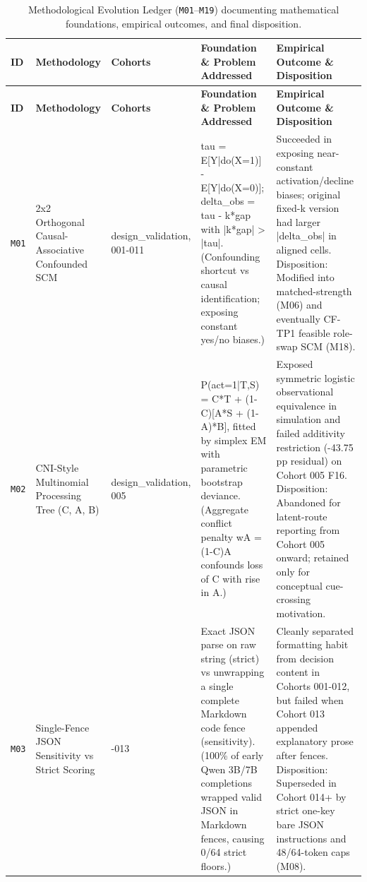 {\footnotesize
\setlength{\tabcolsep}{3.5pt}
\begin{longtable}{@{}>{\raggedright\arraybackslash}p{0.9cm}>{\raggedright\arraybackslash}p{2.7cm}>{\raggedright\arraybackslash}p{1.7cm}>{\raggedright\arraybackslash}p{4.4cm}>{\raggedright\arraybackslash}p{4.7cm}@{}}
\caption{Methodological Evolution Ledger (\texttt{M01}--\texttt{M19}) documenting mathematical foundations, empirical outcomes, and final disposition.}\label{tab:methodology_ledger}\\
\toprule
\textbf{ID} & \textbf{Methodology} & \textbf{Cohorts} & \textbf{Foundation \& Problem Addressed} & \textbf{Empirical Outcome \& Disposition} \\
\midrule
\endfirsthead
\toprule
\textbf{ID} & \textbf{Methodology} & \textbf{Cohorts} & \textbf{Foundation \& Problem Addressed} & \textbf{Empirical Outcome \& Disposition} \\
\midrule
\endhead
\bottomrule
\endfoot
\texttt{M01} & 2x2 Orthogonal Causal-\allowbreak{}Associative Confounded SCM & design\_validation, 001-\allowbreak{}011 & tau = E[Y|do(X=1)] -\allowbreak{} E[Y|do(X=0)]; delta\_obs = tau -\allowbreak{} k*gap with |k*gap| > |tau|. (Confounding shortcut vs causal identification; exposing constant yes/\allowbreak{}no biases.) & Succeeded in exposing near-\allowbreak{}constant activation/\allowbreak{}decline biases; original fixed-\allowbreak{}k version had larger |delta\_obs| in aligned cells. Disposition: Modified into matched-\allowbreak{}strength (M06) and eventually CF-\allowbreak{}TP1 feasible role-\allowbreak{}swap SCM (M18). \\[2pt]
\texttt{M02} & CNI-\allowbreak{}Style Multinomial Processing Tree (C, A, B) & design\_validation, 005 & P(act=1|T,S) = C*T + (1-\allowbreak{}C)[A*S + (1-\allowbreak{}A)*B], fitted by simplex EM with parametric bootstrap deviance. (Aggregate conflict penalty wA = (1-\allowbreak{}C)A confounds loss of C with rise in A.) & Exposed symmetric logistic observational equivalence in simulation and failed additivity restriction (-\allowbreak{}43.75 pp residual) on Cohort 005 F16. Disposition: Abandoned for latent-\allowbreak{}route reporting from Cohort 005 onward; retained only for conceptual cue-\allowbreak{}crossing motivation. \\[2pt]
\texttt{M03} & Single-\allowbreak{}Fence JSON Sensitivity vs Strict Scoring & 001-\allowbreak{}013 & Exact JSON parse on raw string (strict) vs unwrapping a single complete Markdown code fence (sensitivity). (100\% of early Qwen 3B/\allowbreak{}7B completions wrapped valid JSON in Markdown fences, causing 0/\allowbreak{}64 strict floors.) & Cleanly separated formatting habit from decision content in Cohorts 001-\allowbreak{}012, but failed when Cohort 013 appended explanatory prose after fences. Disposition: Superseded in Cohort 014+ by strict one-\allowbreak{}key bare JSON instructions and 48/\allowbreak{}64-\allowbreak{}token caps (M08). \\[2pt]

\end{longtable}}
